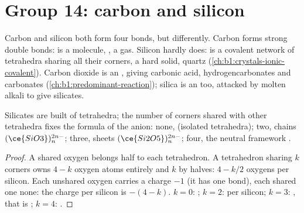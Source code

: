 \section{Group 14: carbon and silicon}

Carbon and silicon both form four bonds, but differently. Carbon forms
strong double bonds:  is a molecule, , a gas. Silicon
hardly does:  is a covalent network of  tetrahedra
sharing all their corners, a hard solid, quartz (\cref{ch:b1:crystals-ionic-covalent}).
Carbon dioxide is an , giving carbonic acid, hydrogencarbonates
and carbonates (\cref{ch:b1:predominant-reaction}); silica is an  too, attacked by molten alkali to give silicates.

\begin{proposition}\label{prop:b1:p-block-13-15:silicate-units}
Silicates are built of  tetrahedra; the number of corners shared
with other tetrahedra fixes the formula of the anion: none, 
(isolated tetrahedra); two, chains $(\ce{SiO3})_n^{2n-}$; three, sheets
$(\ce{Si2O5})_n^{2n-}$; four, the neutral framework .
\end{proposition}

\begin{proof}
A shared oxygen belongs half to each tetrahedron. A tetrahedron sharing
$k$ corners owns $4 - k$ oxygen atoms entirely and $k$ by halves: $4 -
k/2$ oxygens per silicon. Each unshared oxygen carries a charge $-1$ (it
has one bond), each shared one none: the charge per silicon is
$-(4 - k)$. $k = 0$: ; $k = 2$:  per silicon;
$k = 3$: , that is ; $k = 4$: .
\end{proof}

